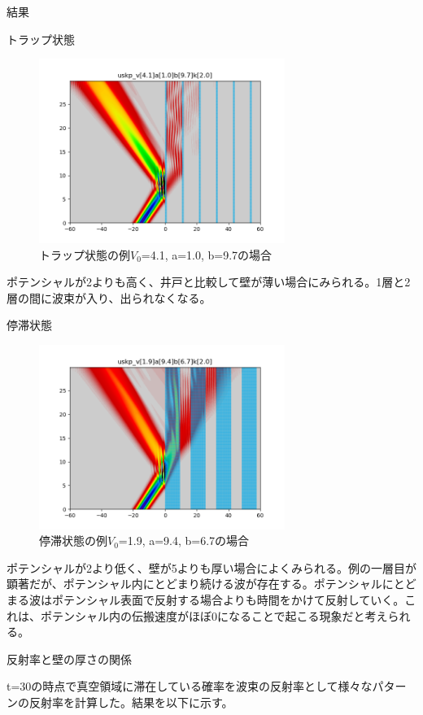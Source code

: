 \documentclass[a4paper, lualatex]{bxjsarticle}
\begin{document}
\begin{section}{結果}
\begin{subsection}{トラップ状態}
        \begin{figure}[h]
            \centering
            \includegraphics[width=8cm]{trap.png}
            \caption{トラップ状態の例$V_0$=4.1, a=1.0, b=9.7の場合}
        \end{figure}
    \par ポテンシャルが2よりも高く、井戸と比較して壁が薄い場合にみられる。1層と2層の間に波束が入り、出られなくなる。
    \end{subsection}
    \begin{subsection}{停滞状態}
        \begin{figure}[h]
            \centering
            \includegraphics[width=8cm]{tetai.png}
            \caption{停滞状態の例$V_0$=1.9, a=9.4, b=6.7の場合}
        \end{figure}
    \par ポテンシャルが2より低く、壁が5よりも厚い場合によくみられる。例の一層目が顕著だが、ポテンシャル内にとどまり続ける波が存在する。ポテンシャルにとどまる波はポテンシャル表面で反射する場合よりも時間をかけて反射していく。これは、ポテンシャル内の伝搬速度がほぼ0になることで起こる現象だと考えられる。
    \end{subsection}
    \begin{subsection}{反射率と壁の厚さの関係}
        \par t=30の時点で真空領域に滞在している確率を波束の反射率として様々なパターンの反射率を計算した。結果を以下に示す。

\end{subsection}
\end{section}
\end{document}
